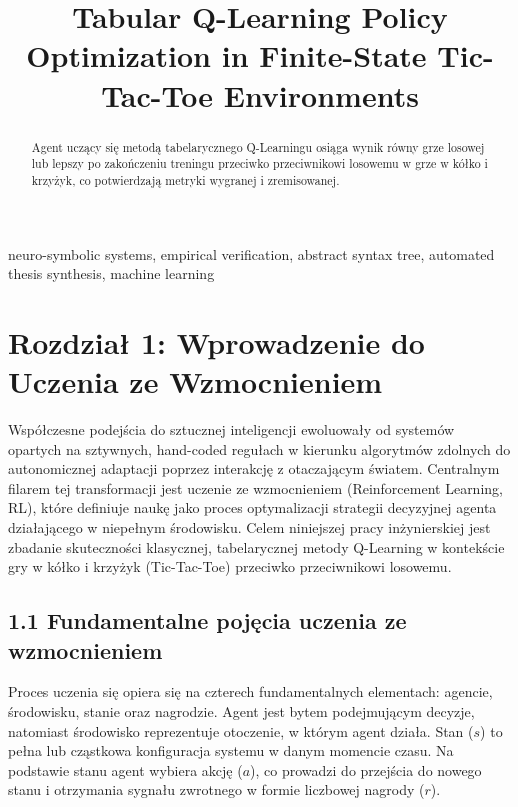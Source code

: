 \documentclass[conference]{IEEEtran}
\begin{document}
\title{Tabular Q-Learning Policy Optimization in Finite-State Tic-Tac-Toe Environments}

\author{
}


\thispagestyle{plain}

\begin{abstract}
Agent uczący się metodą tabelarycznego Q-Learningu osiąga wynik równy grze losowej lub lepszy po zakończeniu treningu przeciwko przeciwnikowi losowemu w grze w kółko i krzyżyk, co potwierdzają metryki wygranej i zremisowanej.
\end{abstract}

\begin{IEEEkeywords}
neuro-symbolic systems, empirical verification, abstract syntax tree, automated thesis synthesis, machine learning
\end{IEEEkeywords}

\section{Rozdział 1: Wprowadzenie do Uczenia ze Wzmocnieniem}
Współczesne podejścia do sztucznej inteligencji ewoluowały od systemów opartych na sztywnych, hand-coded regułach w kierunku algorytmów zdolnych do autonomicznej adaptacji poprzez interakcję z otaczającym światem. Centralnym filarem tej transformacji jest uczenie ze wzmocnieniem (Reinforcement Learning, RL), które definiuje naukę jako proces optymalizacji strategii decyzyjnej agenta działającego w niepełnym środowisku. Celem niniejszej pracy inżynierskiej jest zbadanie skuteczności klasycznej, tabelarycznej metody Q-Learning w kontekście gry w kółko i krzyżyk (Tic-Tac-Toe) przeciwko przeciwnikowi losowemu.

\subsection{1.1 Fundamentalne pojęcia uczenia ze wzmocnieniem}
Proces uczenia się opiera się na czterech fundamentalnych elementach: agencie, środowisku, stanie oraz nagrodzie. Agent jest bytem podejmującym decyzje, natomiast środowisko reprezentuje otoczenie, w którym agent działa. Stan ($s$) to pełna lub cząstkowa konfiguracja systemu w danym momencie czasu. Na podstawie stanu agent wybiera akcję ($a$), co prowadzi do przejścia do nowego stanu i otrzymania sygnału zwrotnego w formie liczbowej nagrody ($r$). 
\end{document}
